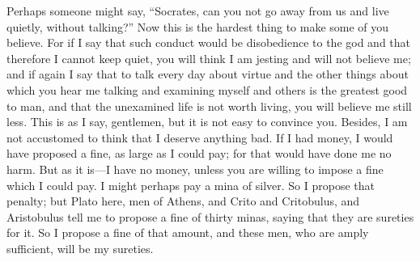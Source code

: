 Perhaps someone might say, “Socrates, can you not go away from us and live quietly, without talking?” Now this is the hardest thing to make some of you believe. For if I say that such conduct would be disobedience to the god and that therefore I cannot keep quiet, you will think I am jesting and will not believe me;  and if again I say that to talk every day about virtue and the other things about which you hear me talking and examining myself and others is the greatest good to man, and that the unexamined life is not worth living, you will believe me still less. This is as I say, gentlemen, but it is not easy to convince you. Besides, I am not accustomed to think that I deserve anything bad. If I had money, I would have proposed a fine,  as large as I could pay; for that would have done me no harm. But as it is—I have no money, unless you are willing to impose a fine which I could pay. I might perhaps pay a mina of silver. So I propose that penalty; but Plato here, men of Athens, and Crito and Critobulus, and Aristobulus tell me to propose a fine of thirty minas, saying that they are sureties for it. So I propose a fine of that amount, and these men, who are amply sufficient, will be my sureties. 

